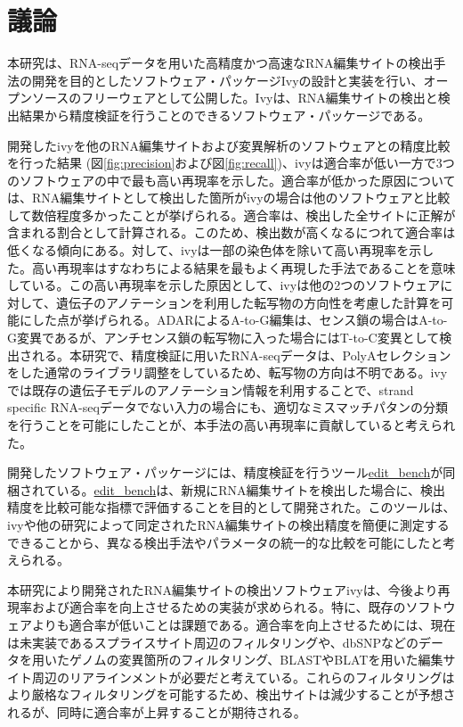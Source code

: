 \section{議論}
本研究は、RNA-seqデータを用いた高精度かつ高速なRNA編集サイトの検出手法の開発を目的としたソフトウェア・パッケージIvyの設計と実装を行い、オープンソースのフリーウェアとして公開した。Ivyは、RNA編集サイトの検出と検出結果から精度検証を行うことのできるソフトウェア・パッケージである。
\par
開発したivyを他のRNA編集サイトおよび変異解析のソフトウェアとの精度比較を行った結果 (図\ref{fig:precision}および図\ref{fig:recall})、ivyは適合率が低い一方で3つのソフトウェアの中で最も高い再現率を示した。適合率が低かった原因については、RNA編集サイトとして検出した箇所がivyの場合は他のソフトウェアと比較して数倍程度多かったことが挙げられる。適合率は、検出した全サイトに正解が含まれる割合として計算される。このため、検出数が高くなるにつれて適合率は低くなる傾向にある。対して、ivyは一部の染色体を除いて高い再現率を示した。高い再現率はすなわち\cite{BahLeeLi1201}による結果を最もよく再現した手法であることを意味している。この高い再現率を示した原因として、ivyは他の2つのソフトウェアに対して、遺伝子のアノテーションを利用した転写物の方向性を考慮した計算を可能にした点が挙げられる。ADARによるA-to-G編集は、センス鎖の場合はA-to-G変異であるが、アンチセンス鎖の転写物に入った場合にはT-to-C変異として検出される。本研究で、精度検証に用いたRNA-seqデータは、PolyAセレクションをした通常のライブラリ調整をしているため、転写物の方向は不明である。ivyでは既存の遺伝子モデルのアノテーション情報を利用することで、strand specific RNA-seqデータでない入力の場合にも、適切なミスマッチパタンの分類を行うことを可能にしたことが、本手法の高い再現率に貢献していると考えられた。
\par
開発したソフトウェア・パッケージには、精度検証を行うツール\url{edit_bench}が同梱されている。\url{edit_bench}は、新規にRNA編集サイトを検出した場合に、検出精度を比較可能な指標で評価することを目的として開発された。このツールは、ivyや他の研究によって同定されたRNA編集サイトの検出精度を簡便に測定するできることから、異なる検出手法やパラメータの統一的な比較を可能にしたと考えられる。
\par
本研究により開発されたRNA編集サイトの検出ソフトウェアivyは、今後より再現率および適合率を向上させるための実装が求められる。特に、既存のソフトウェアよりも適合率が低いことは課題である。適合率を向上させるためには、現在は未実装であるスプライスサイト周辺のフィルタリングや、dbSNPなどのデータを用いたゲノムの変異箇所のフィルタリング、BLASTやBLATを用いた編集サイト周辺のリアラインメントが必要だと考えている。これらのフィルタリングはより厳格なフィルタリングを可能するため、検出サイトは減少することが予想されるが、同時に適合率が上昇することが期待される。
